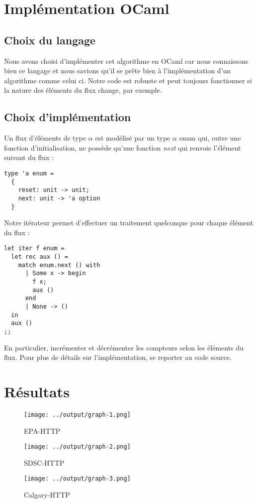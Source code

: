 \documentclass{article}
\begin{document}
\section{Implémentation OCaml}
	
	\subsection{Choix du langage}
		Nous avons choisi d'implémenter cet algorithme en OCaml car nous connaissons bien ce langage et nous savions qu'il se 		prête bien à l'implémentation d'un algorithme comme celui ci. Notre code est robuste et peut toujours fonctionner si 			la nature des éléments du flux change, par exemple.
	
	\subsection{Choix d'implémentation}
		Un flux d'éléments de type $\alpha$ est modélisé par un type $\alpha$ enum qui, outre une fonction d'initialisation, 			ne possède qu'une fonction \emph{next} qui renvoie l'élément suivant du flux :
		
		\begin{lstlisting} 
type 'a enum =
  {
    reset: unit -> unit;
    next: unit -> 'a option
  }
		\end{lstlisting}
		
		Notre itérateur permet d'effectuer un traitement quelconque pour chaque élément du flux :
		
		\begin{lstlisting}
let iter f enum =
  let rec aux () =
    match enum.next () with
      | Some x -> begin
        f x;
        aux ()
      end
      | None -> ()
  in
  aux ()
;;
		\end{lstlisting}
		
		En particulier, incrémenter et décrémenter les compteurs selon les éléments du flux. 
		Pour plus de détails sur l'implémentation, se reporter au code source.
		
\section{Résultats}

\begin{figure}[h!]
  \caption{EPA-HTTP}
  \centering
    \texttt{[image: ../output/graph-1.png]}
\end{figure}

\begin{figure}[h!]
  \caption{SDSC-HTTP}
  \centering
    \texttt{[image: ../output/graph-2.png]}
\end{figure}

\begin{figure}[h!]
  \caption{Calgary-HTTP}
  \centering
    \texttt{[image: ../output/graph-3.png]}
\end{figure}
\end{document}
